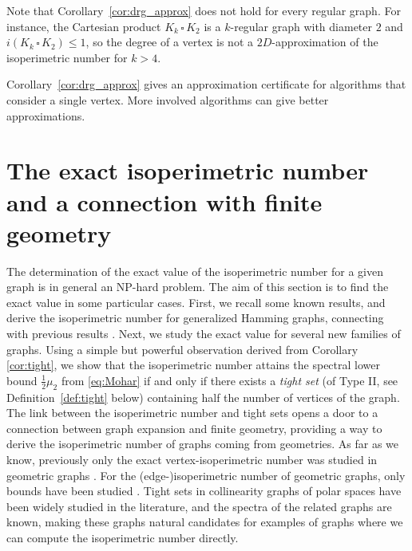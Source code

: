\documentclass[a4paper,11pt]{article}
\theoremstyle{definition}
\newcommand{\cartesianproduct}{\,\square\,}
\begin{document}
Note that Corollary~\ref{cor:drg_approx} does not hold for every regular graph. For instance, the Cartesian product $K_k \cartesianproduct K_2$ is a $k$-regular graph with diameter $2$ and $i(K_k \cartesianproduct K_2) \leq 1$, so the degree of a vertex is not a $2D$-approximation of the isoperimetric number for $k > 4$. 

Corollary~\ref{cor:drg_approx} gives an approximation certificate for algorithms that consider a single vertex. More involved algorithms can give better approximations. 





\section{The exact isoperimetric number and a connection with finite geometry}\label{sec:finitegeometry}

The determination of the exact value of the isoperimetric number for a given graph is in general an NP-hard  problem. The aim of this section is to find the exact value in some particular cases. First, we recall some known results, and derive the isoperimetric number for generalized Hamming graphs, connecting with previous results \cite{M1989, hypercubeedgeisopowers}. Next, we study the exact value for several new families of graphs. Using a simple but powerful observation derived from Corollary \ref{cor:tight}, we show that the isoperimetric number attains the spectral lower bound $\frac12\mu_2$ from \eqref{eq:Mohar} if and only if there exists a \textit{tight set} (of Type II, see Definition~\ref{def:tight} below) containing half the number of vertices of the graph. The link between the isoperimetric number and tight sets 
opens a door to a connection between graph expansion and finite geometry, providing a way to derive the isoperimetric number of graphs coming from geometries.
As far as we know, previously only the exact vertex-isoperimetric number was studied in geometric graphs \cite{Hui18,Price18}. For the (edge-)isoperimetric number of geometric graphs, only bounds have been studied \cite{levi}.
Tight sets in collinearity graphs of polar spaces have been widely studied in the literature, and the spectra of the related graphs are known, making these graphs natural candidates for examples of graphs where we can compute the isoperimetric number directly. 
\end{document}
